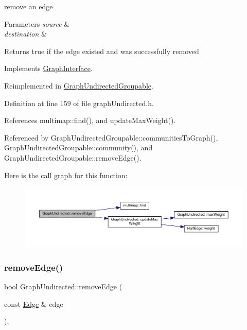 remove an edge


\begin{DoxyParams}{Parameters}
{\em source} & \\
\hline
{\em destination} & \\
\hline
\end{DoxyParams}
\begin{DoxyReturn}{Returns}
true if the edge existed and was successfully removed 
\end{DoxyReturn}


Implements \hyperlink{classGraphInterface_a1297fd6d7c9698197b5f570f2a9f3701}{Graph\+Interface}.



Reimplemented in \hyperlink{classGraphUndirectedGroupable_ad1a488cc292d7e63d289f598aeaaacd6}{Graph\+Undirected\+Groupable}.



Definition at line 159 of file graph\+Undirected.\+h.



References multimap\+::find(), and update\+Max\+Weight().



Referenced by Graph\+Undirected\+Groupable\+::communities\+To\+Graph(), Graph\+Undirected\+Groupable\+::community(), and Graph\+Undirected\+Groupable\+::remove\+Edge().

Here is the call graph for this function\+:
\nopagebreak
\begin{figure}[H]
\begin{center}
\leavevmode
\includegraphics[width=350pt]{classGraphUndirected_af4a40541132a66c9b688a20958057751_cgraph}
\end{center}
\end{figure}
\mbox{\label{classGraphUndirected_ad39275e7a8f7a39734916b8c5400a1d6}} 
\subsubsection{\texorpdfstring{remove\+Edge()}{removeEdge()}\hspace{0.1cm}{\footnotesize\ttfamily [2/2]}}
{\footnotesize\ttfamily bool Graph\+Undirected\+::remove\+Edge (\begin{DoxyParamCaption}\item[{const \hyperlink{classEdge}{Edge} \&}]{edge }\end{DoxyParamCaption})\hspace{0.3cm}{\ttfamily [inline]}, {\ttfamily [virtual]}}

